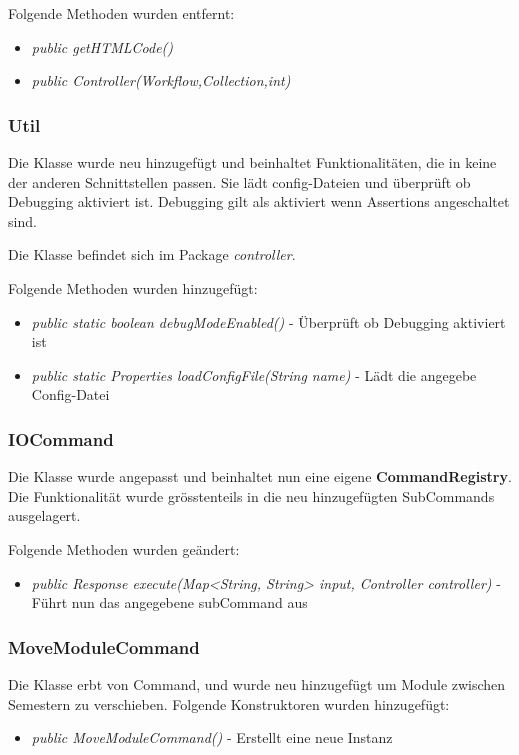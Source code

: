\documentclass[parskip=full]{scrartcl}
\begin{document}
				Folgende Methoden wurden entfernt:
				\begin{itemize}
					\item \textit{public getHTMLCode()} 
					\item \textit{public Controller(Workflow,Collection,int)} 
				\end{itemize}
			
			\subsubsection{Util}
			Die Klasse wurde neu hinzugefügt und beinhaltet Funktionalitäten, die in keine der anderen Schnittstellen passen. 
			Sie lädt config-Dateien und überprüft ob Debugging aktiviert ist. Debugging gilt als aktiviert wenn Assertions angeschaltet sind.
			
			Die Klasse befindet sich im Package \textit{controller}.
					
			Folgende Methoden wurden hinzugefügt:
			\begin{itemize}
				\item \textit{public static boolean debugModeEnabled()}	- Überprüft ob Debugging aktiviert ist	
				\item \textit{public static Properties loadConfigFile(String name)} - Lädt die angegebe Config-Datei
			\end{itemize}
			
		

			\subsubsection{IOCommand}
				Die Klasse wurde angepasst und beinhaltet nun eine eigene \textbf{CommandRegistry}. Die Funktionalität wurde grösstenteils in die neu hinzugefügten SubCommands ausgelagert.
								
				Folgende Methoden wurden geändert:
				\begin{itemize}
					\item \textit{public Response execute(Map<String, String> input, Controller controller)} - Führt nun das angegebene subCommand aus
				\end{itemize}
			
			 \subsubsection{MoveModuleCommand}
			 Die Klasse erbt von Command, und wurde neu hinzugefügt um Module zwischen Semestern zu verschieben.
			 Folgende Konstruktoren wurden hinzugefügt:
			 \begin{itemize}
			 	\item \textit{public MoveModuleCommand()} - Erstellt eine neue Instanz			 	
			 \end{itemize}
			 
\end{document}
